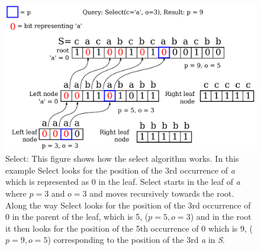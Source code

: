 \begin{figure}
\center \includegraphics[width=1\textwidth]{SelectDrawing}
\caption{Select: This figure shows how the select algorithm works. 
In this example Select looks for the position of the 3rd occurrence of \textit{a} which is represented as 0 in the leaf.
Select starts in the leaf of \textit{a} where $p = 3$ and $o = 3$ and moves recursively towards the root. Along the way Select looks for the position of the 3rd occurrence of 0 in the parent of the leaf, which is 5, ($p=5, o=3$) and in the root it then looks for the position of the 5th occurrence of 0 which is 9, ($p=9, o=5$)  corresponding to the position of the 3rd \textit{a} in \textit{S}.}
\label{fig:SelectDrawing}
\end{figure}

